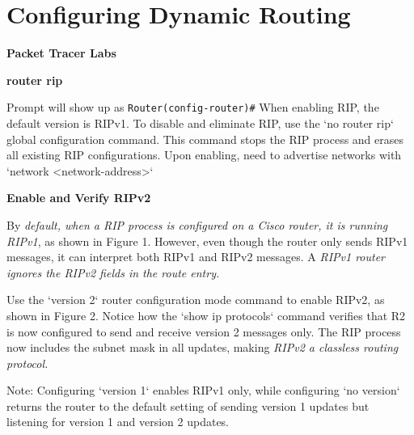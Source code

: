 \documentclass[../EngineeringJournal_CDavis.tex]{subfiles}
\begin{document}

\chapter*{Configuring \linebreak[1] Dynamic Routing \hspace*{\fill}{2020}}
\noindent\textbf{{Packet Tracer Labs} }                             


\hspace{0.2cm}
\begin{tcolorbox}[width=6.3in]
{\bf{router rip}}
\scriptsize
\begin{outline}
  \1 Prompt will show up as \verb$Router(config-router)#$
  \1 When enabling RIP, the default version is RIPv1.
  \1 To disable and eliminate RIP, use the `no router rip` global configuration command. This command stops the RIP process and erases all existing RIP configurations.
  \1 Upon enabling, need to advertise networks with `network <network-address>`
\end{outline}
\end{tcolorbox}
\hspace{0.2cm}
\normalsize  


\hspace{0.2cm}
\begin{tcolorbox}[width=6.3in]
{\bf{Enable and Verify RIPv2}}
\scriptsize

By {\emph{default, when a RIP process is configured on a Cisco router, it is running
RIPv1}}, as shown in Figure 1. However, even though the router only sends RIPv1
messages, it can interpret both RIPv1 and RIPv2 messages. A {\emph{RIPv1 router ignores
the RIPv2 fields in the route entry.}}

Use the `version 2` router configuration mode command to enable RIPv2, as shown in
Figure 2. Notice how the `show ip protocols` command verifies that R2 is now configured
to send and receive version 2 messages only. The RIP process now includes the subnet
mask in all updates, making {\emph{RIPv2 a classless routing protocol.}}

Note: Configuring `version 1` enables RIPv1 only, while configuring `no version` returns the router to the default setting of sending version 1 updates but listening for version 1 and version 2 updates.

\end{tcolorbox}
\hspace{0.2cm}
\normalsize  
\end{document}
